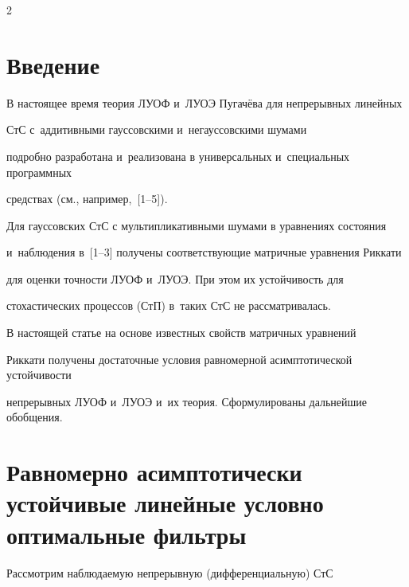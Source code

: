 \begin{multicols}{2}



\label{st\stat}



\section{Введение}



\vspace*{-2pt}



В настоящее время теория ЛУОФ и~ЛУОЭ Пугачёва для  непрерывных  линейных

СтС с~аддитивными гауссовскими и~негауссовскими шумами

подробно разработана и~реализована в универсальных и~специальных программных

средствах (см., например,~[1--5]).



Для  гауссовских СтС с мультипликативными шумами в уравнениях состояния

и~наблюдения в~[1--3] получены соответствующие матричные уравнения Риккати

для оценки точности ЛУОФ и~ЛУОЭ. При этом их устойчивость для

стохастических процессов (СтП)  в~таких СтС  не рассматривалась.



В настоящей статье на основе известных свойств матричных уравнений

Риккати получены достаточные условия равномерной асимптотической устойчивости

непрерывных ЛУОФ и~ЛУОЭ и~их теория. Сформулированы дальнейшие обобщения.



\vspace*{-6pt}



\section{Равномерно асимптотически устойчивые линейные условно оптимальные фильтры}



\vspace*{-2pt}



Рассмотрим наблюдаемую непрерывную (дифференциальную) СтС


\end{multicols}
